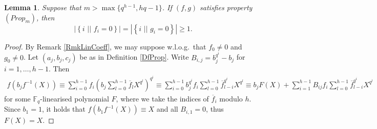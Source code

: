 \documentclass[a4paper]{article}
\newtheorem{lm}[thm]{Lemma}
\theoremstyle{definition}
\newcommand{\FF}{\mathbb F}
\newcommand{\sett}[2]{ \left\{ #1 \, \, || \, \, #2 \right \} }
\begin{document}
\begin{lm}
 \label{LmAtLeastOneZeroCoeff}
 Suppose that $m > \max\{q^{h-1}, hq-1\}$.
 If $(f,g)$ satisfies property $(Prop_m)$, then \[ |\sett{i}{f_i = 0}| = |\sett{i}{g_i = 0}| \geq 1.\]
\end{lm}

\begin{proof}
By Remark \ref{RmkLinCoeff}, we may suppose w.l.o.g.\ that $f_0 \neq 0$ and $g_0 \neq 0$.
Let $(a_j,b_j,c_j)$ be as in Definition \ref{DfProp}.
Write $B_{i,j} = b_j^{q^i} - b_j$ for $i = 1, \dots, h-1$.
Then
\begin{align*}
 f(b_j f^{-1}(X)) \equiv \sum_{i=0}^{h-1} f_i \left( b_j \sum_{l=0}^{h-1} \overline f_l X^{q^l} \right)^{q^i}
 \equiv \sum_{i=0}^{h-1} b_j^{q^i} f_i \sum_{l=0}^{h-1} \overline f_{l-i}^{q^i} X^{q^l} 
 \equiv b_j F(X) + \sum_{i=1}^{h-1} B_{ij} f_i \sum_{l=0}^{h-1} \overline f_{l-i}^{q^i} X^{q^l} 
\end{align*}
for some $\FF_q$-linearised polynomial $F$, where we take the indices of $\overline f_i$ modulo $h$.
Since $b_1=1$, it holds that $f( b_1 f^{-1}(X)) \equiv X$ and all $B_{i,1}=0$, thus $F(X) = X$.


\end{proof}
\end{document}
